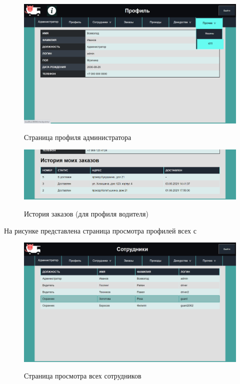 \begin{figure}[h!] 
	\begin{center}
		{\includegraphics[scale=0.45, angle=0]{sc/admin_profile}}
		\caption{Страница профиля администратора}
		\label{sc:navbar}
	\end{center}
\end{figure}

\begin{figure}[h!] 
	\begin{center}
		{\includegraphics[scale=0.45, angle=0]{sc/driver_profile}}
		\caption{История заказов (для профиля водителя)}
		\label{sc:driver_profile}
	\end{center}
\end{figure}

На рисунке представлена страница просмотра профилей всех с
\begin{figure}[h!] 
	\begin{center}
		{\includegraphics[scale=0.43, angle=0]{sc/all_profiles}}
		\caption{Страница просмотра всех сотрудников}
		\label{all_profiles_sc}
	\end{center}
\end{figure}

